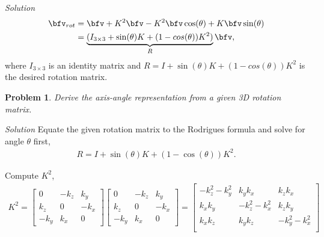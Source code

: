 \documentclass{article}
\newtheorem{prob}{Problem}
\numberwithin{prob}{section}
\newenvironment{solution}{\emph{Solution}}{}
\begin{document}
\begin{solution}
\begin{align}
  \bfv_{rot} &= \bfv + K^2 \bfv - K^2 \bfv \cos(\theta) + K \bfv \sin(\theta)\\
             &= \underbrace{(I_{3\times3} + \sin(\theta)K + (1-cos(\theta)) K^2)}_{R}\bfv,
\end{align}
where $I_{3\times3}$ is an identity matrix and $R = I + \sin(\theta)K + (1-cos(\theta)) K^2$ is the desired rotation matrix.


\end{solution}

\begin{prob}
  Derive the axis-angle representation from a given 3D rotation matrix.
\end{prob}

\begin{solution}
Equate the given rotation matrix to the Rodrigues formula and solve for angle $\theta$ first,
\begin{align}
  R = I + \sin(\theta) K + (1-\cos(\theta)) K^2.
\end{align}

Compute $K^2$,
\begin{align}
  K^2 = \begin{bmatrix}
    0 & -k_z & k_y\\
    k_z & 0 & -k_x\\
    -k_y & k_x & 0
  \end{bmatrix}
  \begin{bmatrix}
    0 & -k_z & k_y\\
    k_z & 0 & -k_x\\
    -k_y & k_x & 0
  \end{bmatrix}
  = \begin{bmatrix}
    -k_z^2 - k_y^2 & k_y k_x & k_z k_x \\
    k_x k_y & -k_z^2 - k_x^2 & k_z k_y \\
    k_x k_z &  k_y k_z & -k_y^2 - k_x^2\\
  \end{bmatrix}
\end{align}


\end{solution}
\end{document}
